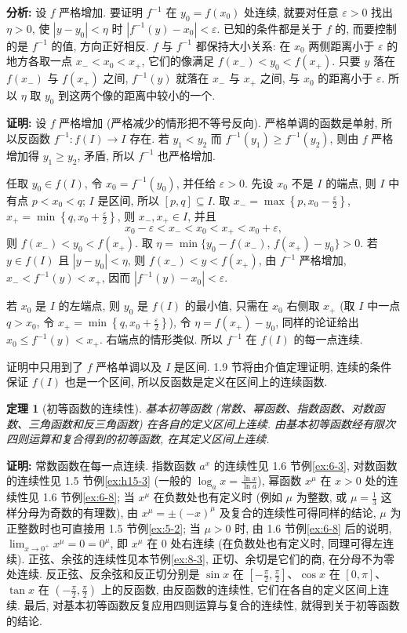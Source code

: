\documentclass[UTF8,openany]{ctexbook}
\theoremstyle{chinesetextbook}
\newtheorem{theorem}{定理}[section]
\newenvironment{cnproof}{\par\indent\textbf{证明:} \ignorespaces}{\par}
\begin{document}
\par\indent\textbf{分析:} 设 $f$ 严格增加. 要证明 $f^{-1}$ 在 $y_0=f(x_0)$ 处连续, 就要对任意 $\varepsilon>0$ 找出 $\eta>0$, 使 $|y-y_0|<\eta$ 时 $|f^{-1}(y)-x_0|<\varepsilon$. 已知的条件都是关于 $f$ 的, 而要控制的是 $f^{-1}$ 的值, 方向正好相反. $f$ 与 $f^{-1}$ 都保持大小关系: 在 $x_0$ 两侧距离小于 $\varepsilon$ 的地方各取一点 $x_-<x_0<x_+$, 它们的像满足 $f(x_-)<y_0<f(x_+)$. 只要 $y$ 落在 $f(x_-)$ 与 $f(x_+)$ 之间, $f^{-1}(y)$ 就落在 $x_-$ 与 $x_+$ 之间, 与 $x_0$ 的距离小于 $\varepsilon$. 所以 $\eta$ 取 $y_0$ 到这两个像的距离中较小的一个.
\begin{cnproof}
设 $f$ 严格增加 (严格减少的情形把不等号反向). 严格单调的函数是单射, 所以反函数 $f^{-1}:f(I)\to I$ 存在. 若 $y_1<y_2$ 而 $f^{-1}(y_1)\ge f^{-1}(y_2)$, 则由 $f$ 严格增加得 $y_1\ge y_2$, 矛盾, 所以 $f^{-1}$ 也严格增加.

任取 $y_0\in f(I)$, 令 $x_0=f^{-1}(y_0)$, 并任给 $\varepsilon>0$. 先设 $x_0$ 不是 $I$ 的端点, 则 $I$ 中有点 $p<x_0<q$; $I$ 是区间, 所以 $[p,q]\subseteq I$. 取 $\displaystyle x_-=\max\left\{p,x_0-\frac\varepsilon2\right\}$, $\displaystyle x_+=\min\left\{q,x_0+\frac\varepsilon2\right\}$, 则 $x_-,x_+\in I$, 并且
\[
x_0-\varepsilon<x_-<x_0<x_+<x_0+\varepsilon,
\]
则 $f(x_-)<y_0<f(x_+)$. 取 $\eta=\min\{y_0-f(x_-),\,f(x_+)-y_0\}>0$. 若 $y\in f(I)$ 且 $|y-y_0|<\eta$, 则 $f(x_-)<y<f(x_+)$, 由 $f^{-1}$ 严格增加, $x_-<f^{-1}(y)<x_+$, 因而 $|f^{-1}(y)-x_0|<\varepsilon$.

若 $x_0$ 是 $I$ 的左端点, 则 $y_0$ 是 $f(I)$ 的最小值, 只需在 $x_0$ 右侧取 $x_+$ (取 $I$ 中一点 $q>x_0$, 令 $\displaystyle x_+=\min\left\{q,x_0+\frac\varepsilon2\right\}$), 令 $\eta=f(x_+)-y_0$, 同样的论证给出 $x_0\le f^{-1}(y)<x_+$. 右端点的情形类似. 所以 $f^{-1}$ 在 $f(I)$ 的每一点连续.
\end{cnproof}
证明中只用到了 $f$ 严格单调以及 $I$ 是区间. 1.9 节将由介值定理证明, 连续的条件保证 $f(I)$ 也是一个区间, 所以反函数是定义在区间上的连续函数.
\begin{theorem}[初等函数的连续性]
基本初等函数 (常数、幂函数、指数函数、对数函数、三角函数和反三角函数) 在各自的定义区间上连续. 由基本初等函数经有限次四则运算和复合得到的初等函数, 在其定义区间上连续.
\end{theorem}
\begin{cnproof}
常数函数在每一点连续. 指数函数 $a^x$ 的连续性见 1.6 节例\ref{ex:6-3}, 对数函数的连续性见 1.5 节例\ref{ex:h15-3} (一般的 $\displaystyle\log_ax=\frac{\ln x}{\ln a}$), 幂函数 $x^\mu$ 在 $x>0$ 处的连续性见 1.6 节例\ref{ex:6-8}; 当 $x^\mu$ 在负数处也有定义时 (例如 $\mu$ 为整数, 或 $\displaystyle\mu=\frac13$ 这样分母为奇数的有理数), 由 $x^\mu=\pm(-x)^\mu$ 及复合的连续性可得同样的结论, $\mu$ 为正整数时也可直接用 1.5 节例\ref{ex:5-2}; 当 $\mu>0$ 时, 由 1.6 节例\ref{ex:6-8} 后的说明, $\displaystyle\lim_{x\to0^+}x^\mu=0=0^\mu$, 即 $x^\mu$ 在 $0$ 处右连续 (在负数处也有定义时, 同理可得左连续). 正弦、余弦的连续性见本节例\ref{ex:8-3}, 正切、余切是它们的商, 在分母不为零处连续. 反正弦、反余弦和反正切分别是 $\sin x$ 在 $\displaystyle\left[-\frac\pi2,\frac\pi2\right]$、$\cos x$ 在 $[0,\pi]$、$\tan x$ 在 $\displaystyle\left(-\frac\pi2,\frac\pi2\right)$ 上的反函数, 由反函数的连续性, 它们在各自的定义区间上连续. 最后, 对基本初等函数反复应用四则运算与复合的连续性, 就得到关于初等函数的结论.
\end{cnproof}
\end{document}
